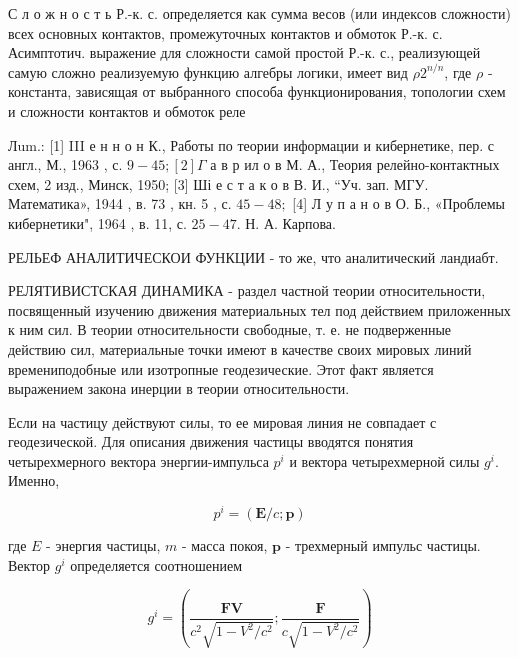 \documentclass[10pt]{article}
\begin{document}
С л о ж н о с т ь Р.-к. с. определяется как сумма весов (или индексов сложности) всех основных контактов, промежуточных контактов и обмоток Р.-к. с. Асимптотич. выражение для сложности самой простой Р.-к. с., реализующей самую сложно реализуемую функцию алгебры логики, имеет вид $\rho 2^{n / n}$, где $\rho$ - константа, зависящая от выбранного способа функционирования, топологии схем и сложности контактов и обмоток реле



Лum.: [1] III е н н о н К., Работы по теории информации и кибернетике, пер. с англ., М., 1963 , с. $9-45 ;[2] \Gamma$ а в р ил о в М. А., Теория релейно-контактных схем, 2 изд., Минск, 1950; [3] Ші е с т а к о в В. И., “Уч. зап. МГУ. Математика», 1944 , в. 73 , кн. 5 , с. $45-48 ;$ [4] Л у п а н о в О. Б., «Проблемы кибернетики", 1964 , в. 11, с. $25-47$. Н. А. Карпова.



РЕЛЬЕФ АНАЛИТИЧЕСКОИ ФУНКЦИИ - то же, что аналитический ландиабт.



РЕЛЯТИВИСТСКАЯ ДИНАМИКА - раздел частной теории относительности, посвященный изучению движения материальных тел под действием приложенных к ним сил. В теории относительности свободные, т. е. не подверженные действию сил, материальные точки имеют в качестве своих мировых линий времениподобные или изотропные геодезические. Этот факт является выражением закона инерции в теории относительности.



Если на частицу действуют силы, то ее мировая линия не совпадает с геодезической. Для описания движения частицы вводятся понятия четырехмерного вектора энергии-импульса $p^{i}$ и вектора четырехмерной силы $g^{i}$. Именно,



\[

p^{i}=(\boldsymbol{E} / c ; \boldsymbol{p})

\]



где $E$ - энергия частицы, $m$ - масса покоя, $\boldsymbol{p}$ - трехмерный импульс частицы. Вектор $g^{i}$ определяется соотношением



\[

g^{i}=\left(\frac{\boldsymbol{F V}}{c^{2} \sqrt{1-V^{2} / c^{2}}} ; \frac{\boldsymbol{F}}{c \sqrt{1-V^{2} / c^{2}}}\right)

\]
\end{document}
